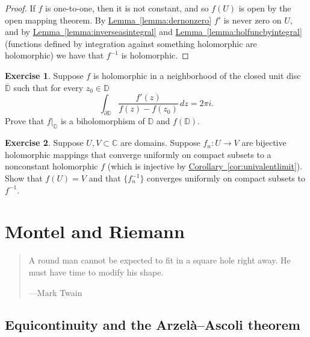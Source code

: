 \documentclass[12pt,openany]{book}
\newcommand{\C}{{\mathbb{C}}}
\newcommand{\D}{{\mathbb{D}}}
\theoremstyle{plain}
\theoremstyle{remark}
\theoremstyle{definition}
\newenvironment{exbox}{%
    \def\FrameCommand{\vrule width 1pt \relax\hspace {10pt}}%
    \MakeFramed {\advance \hsize -\width \FrameRestore }%
}{%
    \endMakeFramed
}
\newenvironment{myquote}{%
    \begin{quote}%
    \begingroup\itshape
}{%
    \endgroup%
    \end{quote}
}
\theoremstyle{exercise}
\newtheorem{exercise}{Exercise}[section]
\theoremstyle{example}
\newcommand{\lemmaref}[1]{\hyperref[#1]{Lemma~\ref*{#1}}}
\newcommand{\corref}[1]{\hyperref[#1]{Corollary~\ref*{#1}}}
\begin{document}
\begin{proof}
If $f$ is one-to-one, then it is not constant, and so $f(U)$ is open by
the open mapping theorem.  By \lemmaref{lemma:dernonzero} $f'$ is never zero
on $U$, and by \lemmaref{lemma:inverseasintegral} and
\lemmaref{lemma:holfuncbyintegral} (functions defined by integration against
something holomorphic are holomorphic)
we have that $f^{-1}$ is holomorphic.
\end{proof}

\begin{exbox}
\begin{exercise}
Suppose $f$ is holomorphic in a neighborhood of the closed unit disc
$\overline{\D}$ such that for every $z_0 \in \D$
\begin{equation*}
\int_{\partial \D}
\frac{f'(z)}{f(z)-f(z_0)}
\, dz = 2\pi i .
\end{equation*}
Prove that $f|_{\D}$ is a biholomorphism of $\D$ and $f(\D)$.
\end{exercise}

\begin{exercise}
Suppose $U,V \subset \C$ are domains.
Suppose $f_n \colon U \to V$ are bijective holomorphic mappings
that converge uniformly on compact subsets to a nonconstant
holomorphic $f$ (which is injective by \corref{cor:univalentlimit}).
Show that $f(U) = V$ and that $\bigl\{ f_n^{-1} \bigr\}$ converges uniformly on
compact subsets to $f^{-1}$.
\end{exercise}
\end{exbox}



\chapter{Montel and Riemann} \label{ch:montelriemann}

\begin{myquote}
A round man cannot be expected to fit in a square hole right away. He must
have time to modify his shape.

---Mark Twain
\end{myquote}


\section{Equicontinuity and the Arzel\`a--Ascoli theorem}
\label{sec:arzelaascoli}
\end{document}
